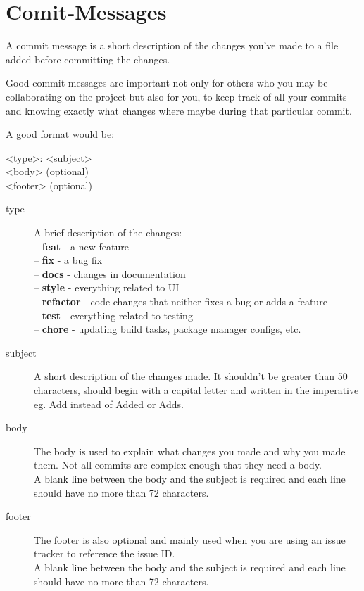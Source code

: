\section{Comit-Messages}
A commit message is a short description of the changes you've made to a file added before committing the changes.\par
\bigskip
Good commit messages are important not only for others who you may be collaborating on the project but also for you, to keep track of all your commits and knowing exactly what changes where maybe during that particular commit.\par
\bigskip
A good format would be:\par
<type>: <subject>\\
<body> (optional)\\
<footer> (optional)\\
\begin{description}
    \item[type] A brief description of the changes:\\
    -- \textbf{feat} - a new feature\\
    -- \textbf{fix} - a bug fix\\
    -- \textbf{docs} - changes in documentation\\
    -- \textbf{style} - everything related to UI\\
    -- \textbf{refactor} - code changes that neither fixes a bug or adds a feature\\
    -- \textbf{test} - everything related to testing\\
    -- \textbf{chore} - updating build tasks, package manager configs, etc.\\
    \item[subject] A short description of the changes made. It shouldn't be greater than 50 characters, should begin with a capital letter and written in the imperative eg. Add instead of Added or Adds.
    \item[body] The body is used to explain what changes you made and why you made them. Not all commits are complex enough that they need a body.\\    
    A blank line between the body and the subject is required and each line should have no more than 72 characters.
    \item[footer] The footer is also optional and mainly used when you are using an issue tracker to reference the issue ID.\\
    A blank line between the body and the subject is required and each line should have no more than 72 characters.
\end{description}

